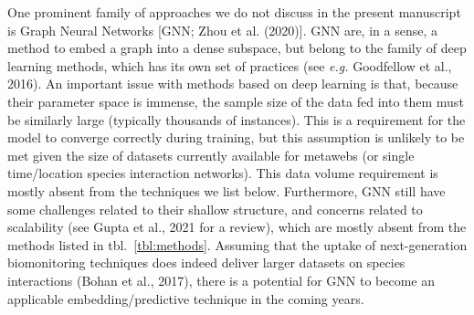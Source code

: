 \documentclass[11pt]{article}
\begin{document}
One prominent family of approaches we do not discuss in the present
manuscript is Graph Neural Networks {[}GNN; Zhou et al. (2020){]}. GNN
are, in a sense, a method to embed a graph into a dense subspace, but
belong to the family of deep learning methods, which has its own set of
practices (see \emph{e.g.} Goodfellow et al., 2016). An important issue
with methods based on deep learning is that, because their parameter
space is immense, the sample size of the data fed into them must be
similarly large (typically thousands of instances). This is a
requirement for the model to converge correctly during training, but
this assumption is unlikely to be met given the size of datasets
currently available for metawebs (or single time/location species
interaction networks). This data volume requirement is mostly absent
from the techniques we list below. Furthermore, GNN still have some
challenges related to their shallow structure, and concerns related to
scalability (see Gupta et al., 2021 for a review), which are mostly
absent from the methods listed in tbl.~\ref{tbl:methods}. Assuming that
the uptake of next-generation biomonitoring techniques does indeed
deliver larger datasets on species interactions (Bohan et al., 2017),
there is a potential for GNN to become an applicable
embedding/predictive technique in the coming years.
\end{document}
